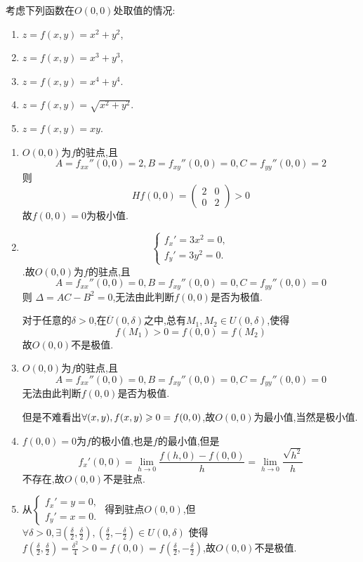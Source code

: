 \begin{example}
    考虑下列函数在$O(0,0)$处取值的情况:
    \begin{enumerate}
        \item $z=f(x,y) = x^2 + y^2$,
        \item $z=f(x,y) = x^3 + y^3$,
        \item $z=f(x,y) = x^4 + y^4$.
        \item $z=f(x,y) = \sqrt{x^2 + y^2}$.
        \item $z=f(x,y) = xy$.
    \end{enumerate}
\end{example}

\begin{solution}
    \begin{enumerate}
        \item $O(0,0)$为$f$的驻点,且
        $$ A = f_{xx}''(0,0) = 2, B = f_{xy}''(0,0) = 0, C = f_{yy}''(0,0) = 2$$
        则
        $$Hf(0,0) = \begin{pmatrix}
            2 & 0\\
            0 & 2
        \end{pmatrix} > 0$$
        故$f(0,0) = 0$为极小值.
        \item $$\begin{cases}
            f_x' = 3x^2 = 0,\\
            f_y' = 3y^2 = 0.
        \end{cases}$$.故$O(0,0)$为$f$的驻点,且
        $$ A = f_{xx}''(0,0) = 0, B = f_{xy}''(0,0) = 0, C = f_{yy}''(0,0) = 0$$
        则
        $\Delta = AC - B^2 = 0$,无法由此判断$f(0,0)$是否为极值.

        对于任意的$\delta > 0 $,在$\overline U(0,\delta)$之中,总有$M_1,M_2 \in U(0,\delta)$,使得
        $$f(M_1) > 0 = f(0,0) = f(M_2)$$
        故$O(0,0)$不是极值.
        \item $O(0,0)$为$f$的驻点,且
        $$ A = f_{xx}''(0,0) = 0, B = f_{xy}''(0,0) = 0, C = f_{yy}''(0,0) = 0$$
        无法由此判断$f(0,0)$是否为极值.

        但是不难看出$\forall (x,y) , f(x,y) \geqslant 0 = f(0,0)$,故$O(0,0)$为最小值,当然是极小值.
        \item $f(0,0) = 0$为$f$的极小值,也是$f$的最小值,但是
        $$f_x'(0,0) = \lim_{h \to 0} \frac{f(h,0) - f(0,0)}{h} = \lim_{h \to 0} \frac{\sqrt{h^2}}{h} $$不存在,故$O(0,0)$不是驻点.
        \item 从$\begin{cases}
            f_x' = y = 0,\\
            f_y' = x = 0.
        \end{cases}$ 得到驻点$O(0,0)$,但
        $\forall \delta > 0 , \exists (\frac{\delta}{2},\frac{\delta}{2}), (\frac{\delta}{2},-\frac{\delta}{2}) \in U(0,\delta)$
        使得$f(\frac{\delta}{2},\frac{\delta}{2}) = \frac{\delta^2}{4} > 0 = f(0,0) = f(\frac{\delta}{2},-\frac{\delta}{2})$,故$O(0,0)$不是极值.
    \end{enumerate}
\end{solution}

